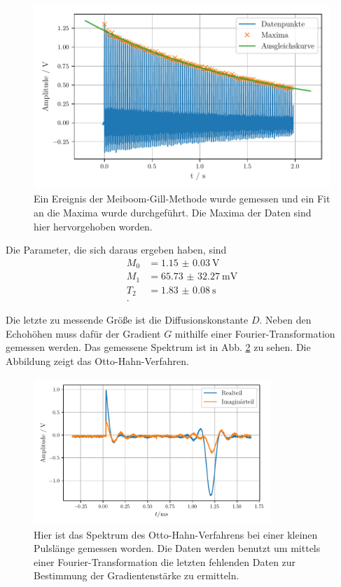 \begin{figure}
    \centering
    \includegraphics[width=\textwidth]{plots/T2.pdf}
    \caption{Ein Ereignis der Meiboom-Gill-Methode wurde gemessen und ein Fit an die Maxima wurde durchgeführt. Die Maxima der Daten sind hier hervorgehoben worden.}
    \label{abb:t2}
\end{figure}

Die Parameter, die sich daraus ergeben haben, sind 
\begin{align*}
    M_0 &= \SI{1.15(3)}{\volt} \\
    M_1 &= \SI{65.73(3227)}{\milli\volt} \\
    T_2 &= \SI{1.83(8)}{\second} \\.
\end{align*}

Die letzte zu messende Größe ist die Diffusionskonstante $D$. Neben den Echohöhen muss dafür der Gradient $G$ mithilfe einer Fourier-Transformation gemessen werden. 
Das gemessene Spektrum ist in Abb. \ref{abb:spektrum} zu sehen. Die Abbildung zeigt das Otto-Hahn-Verfahren.
\begin{figure}
    \centering
    \includegraphics[width=0.8\textwidth]{plots/spektrum.pdf}
    \caption{Hier ist das Spektrum des Otto-Hahn-Verfahrens bei einer kleinen Pulslänge gemessen worden. Die Daten werden benutzt um mittels einer Fourier-Transformation die letzten fehlenden Daten zur Bestimmung der Gradientenstärke zu ermitteln.}
    \label{abb:spektrum}
\end{figure}

